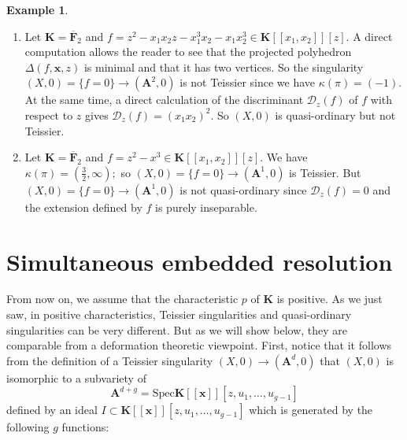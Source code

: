 \documentclass[11pt, a4paper]{amsart}
\numberwithin{equation}{section}
\theoremstyle{plain}
\theoremstyle{definition}
\newtheorem{Ex}[Thm]{Example}
\theoremstyle{remark}
\newcommand{\K}{\mathbf{K}}
\newcommand{\0}{{\boldsymbol 0}}
\newcommand{\x}{{\boldsymbol x}}
\begin{document}
\begin{Ex}\label{first example}
\begin{enumerate}
\item Let $\K=\overline{\textbf{F}}_2$ and $f=z^2-x_1x_2z-x_1^3x_2-x_1x_2^3\in \K[[x_1,x_2]][z].$ A 
direct computation allows the reader to see that the projected 
polyhedron $\Delta(f,\x,z)$ is minimal and that it has two vertices. So the singularity $(X,0)=\{f=0\}\longrightarrow (\textbf{A}^2,0)$ 
is not Teissier since we have $\kappa(\pi)=(-1).$ At the same time, a direct 
calculation of the discriminant $\mathcal{D}_z(f)$ of $f$ with respect to $z$ gives $\mathcal{D}_z(f)=(x_1x_2)^2.$ So $(X,0)$ is
quasi-ordinary but not Teissier.
\item Let $\K=\overline{\textbf{F}}_2$ and $f=z^2-x^3\in \K[[x_1,x_2]][z].$
We have $\kappa(\pi)=(\frac{3}{2},\infty);$ so  $(X,0)=\{f=0\}\longrightarrow (\textbf{A}^1,0)$ is Teissier. But $(X,0)=\{f=0\}\longrightarrow (\textbf{A}^1,0)$ is not quasi-ordinary since $\mathcal{D}_z(f)=0$ and the extension defined by $f$ is purely inseparable.   
\end{enumerate}
\end{Ex}
\section{Simultaneous embedded resolution} 
From now on, we assume that the characteristic $p$ of $\K$ is positive.
As we just saw, in positive characteristics, Teissier singularities and quasi-ordinary singularities can be very different. But as we will show below, they are comparable from a deformation 
theoretic viewpoint. First, notice that it follows from the definition of a Teissier singularity $(X,0)\longrightarrow (\mathbf{A}^d,0)$ that $(X,0)$ is isomorphic to a subvariety of $$\mathbf{A}^{d+g}=\mathrm{Spec}\K[[\x]][z,u_1,\ldots,u_{g-1}]$$ defined by an ideal $I\subset \K[[\x]][z,u_1,\ldots,u_{g-1}]$ which is generated by the following $g$ functions:


\iffalse 
$$
\begin{array}{ll}
     u_1-(z^{n_1}-c_{A_1}\x^{A_1}+h_1(\x,z,u_1)),\\
     u_2-(u_1^{n_2} -c_{A_2,b_2^{(0)}}\x^{A_2}z^{b_2^{(0)}}+h_2(\x,z,u_1,u_2)),\\
\vdots \\
    u_{g}-(u_{g-1}^{n_g}-c_{A_{g},b_{g}^{(0)},\bf{b_{g}}}\x^{A_{g}}z^{b_{g}^{(0)}}\textbf{u}^{\bf{b_{g}}}+h_{g}(\x,z,u_1,\ldots,u_{g-1})), 
     \end{array} $$
\begin{equation}\label{equations}
 u_{g}^{n_{g+1}}-c_{A_{g+1},b_{g+1}^{(0)},\bf{b_{g+1}}}\x^{A_{g+1}}z^{b_{g+1}^{(0)}}\textbf{u}^{\bf{b_{g+1}}}+h_{g+1}(\x,z,u_1,\ldots,u_{g})),
\end{equation}    
\fi      
\end{document}
